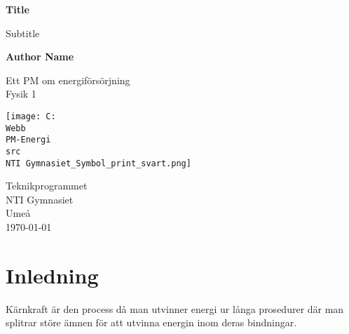 \documentclass[11pt]{article}
\begin{document}
    \begin{titlepage}
        \begin{center}
            \vspace*{1cm}

            \Huge
            \textbf{Title}

            \vspace{0.5cm}
            \LARGE
            Subtitle

            \vspace{1.5cm}

            \textbf{Author Name}

            \vfill

            Ett PM om energiförsörjning \\
            Fysik 1

            \vspace{0.8cm}

             \texttt{[image: C:\\Webb\\PM-Energi\\src\\NTI Gymnasiet\_Symbol\_print\_svart.png]}

            \Large
            Teknikprogrammet\\
            NTI Gymnasiet\\
            Umeå\\
            \today

        \end{center}
    \end{titlepage}

    \tableofcontents
    \newpage

    \section{Inledning}
    Kärnkraft är den process då man utvinner energi ur långa prosedurer där man splitrar störe ämnen för att utvinna energin inom deras bindningar.
\end{document}
